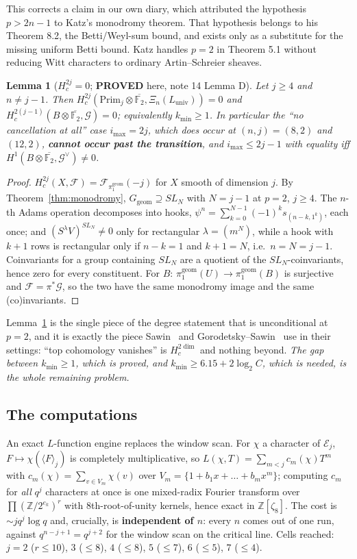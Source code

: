 \documentclass[10pt]{article}
\theoremstyle{plain}
\newtheorem{lemma}[theorem]{Lemma}
\theoremstyle{definition}
\newcommand{\F}{\mathbb F}
\newcommand{\Z}{\mathbb Z}
\newcommand{\E}{\mathcal E}
\newcommand{\Prim}{\mathrm{Prim}}
\newcommand{\Luniv}{L_{\mathrm{univ}}}
\newcommand{\Ggeom}{G_{\mathrm{geom}}}
\newcommand{\imax}{i_{\max}}
\newcommand{\kmin}{k_{\min}}
\newcommand{\proved}{\textcolor{proved}{\textsf{\textbf{\footnotesize PROVED}}}}
\begin{document}
This corrects a claim in our own diary, which attributed the hypothesis
$p>2n-1$ to Katz's monodromy theorem. That hypothesis belongs to his Theorem
8.2, the Betti/Weyl-sum bound, and exists only as a substitute for the missing
uniform Betti bound. Katz handles $p=2$ in Theorem 5.1 without reducing Witt
characters to ordinary Artin--Schreier sheaves.

\begin{lemma}[$H^{2j}_c=0$; \proved{} here, note 14 Lemma D]\label{lem:D}
Let $j\ge4$ and $n\ne j-1$. Then
$H^{2j}_c(\Prim_j\otimes\overline{\F_2},\Xi_n(\Luniv))=0$ and
$H^{2(j-1)}_c(B\otimes\overline{\F_2},\mathcal G)=0$; equivalently $\kmin\ge1$.
In particular the ``no cancellation at all'' case $\imax=2j$, which does occur
at $(n,j)=(8,2)$ and $(12,2)$, \textbf{cannot occur past the transition}, and
$\imax\le2j-1$ with equality iff $H^1(B\otimes\overline{\F_2},\mathcal G^{\vee})\ne0$.
\end{lemma}

\begin{proof}
$H^{2j}_c(X,\mathcal F)=\mathcal F_{\pi_1^{\mathrm{geom}}}(-j)$ for $X$ smooth
of dimension $j$. By Theorem~\ref{thm:monodromy}, $\Ggeom\supseteq SL_N$ with
$N=j-1$ at $p=2$, $j\ge4$. The $n$-th Adams operation decomposes into hooks,
$\psi^n=\sum_{k=0}^{N-1}(-1)^ks_{(n-k,1^k)}$, each once; and
$(S^\lambda V)^{SL_N}\ne0$ only for rectangular $\lambda=(m^N)$, while a hook
with $k+1$ rows is rectangular only if $n-k=1$ and $k+1=N$, i.e.\ $n=N=j-1$.
Coinvariants for a group containing $SL_N$ are a quotient of the
$SL_N$-coinvariants, hence zero for every constituent. For $B$:
$\pi_1^{\mathrm{geom}}(U)\to\pi_1^{\mathrm{geom}}(B)$ is surjective and
$\mathcal F=\pi^*\mathcal G$, so the two have the same monodromy image and the
same (co)invariants.
\end{proof}

Lemma~\ref{lem:D} is the single piece of the degree statement that is
unconditional at $p=2$, and it is exactly the piece Sawin~\cite{Sawin1805} and
Gorodetsky--Sawin~\cite{GS} use in their settings: ``top cohomology vanishes''
is $H^{2\dim}_c$ and nothing beyond. \emph{The gap between $\kmin\ge1$, which is
proved, and $\kmin\ge6.15+2\log_2C$, which is needed, is the whole remaining
problem.}

\subsection{The computations}

An exact $L$-function engine replaces the window scan. For $\chi$ a character
of $\E_j$, $F\mapsto\chi(\langle F\rangle_j)$ is completely multiplicative, so
$L(\chi,T)=\sum_{m<j}c_m(\chi)T^m$ with $c_m(\chi)=\sum_{v\in V_m}\chi(v)$ over
$V_m=\{1+b_1x+\dots+b_mx^m\}$; computing $c_m$ for \emph{all} $q^j$ characters
at once is one mixed-radix Fourier transform over
$\prod(\Z/2^{e_k})^r$ with $8$th-root-of-unity kernels, hence exact in
$\Z[\zeta_8]$. The cost is $\sim jq^j\log q$ and, crucially, is
\textbf{independent of $n$}: every $n$ comes out of one run, against
$q^{n-j+1}=q^{j+2}$ for the window scan on the critical line. Cells reached:
$j=2$ ($r\le10$), $3$ ($\le8$), $4$ ($\le8$), $5$ ($\le7$), $6$ ($\le5$),
$7$ ($\le4$).
\end{document}
